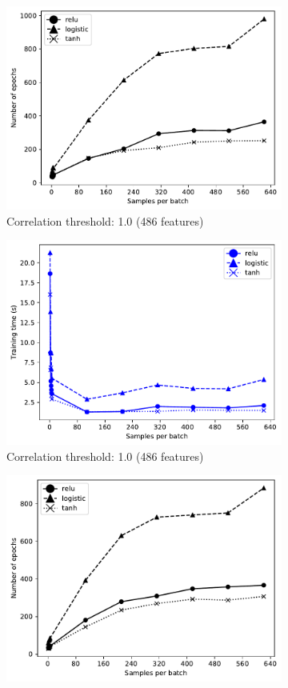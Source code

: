 \documentclass[paper=a4, fontsize=11pt]{scrartcl} %
\begin{document}
\begin{figure}[H]
	\begin{subfigure}{0.5\linewidth}
		\centering
		\includegraphics[width=0.8\linewidth]{../output/neural_network/figures/nn_convergence_global_standard_941_486}
		\caption{Correlation threshold: 1.0 (486 features)}
	\end{subfigure}
	\begin{subfigure}{0.5\linewidth}
		\centering
		\includegraphics[width=0.8\linewidth]{../output/neural_network/figures/nn_convergence_global_standard_941_486_time}
		\caption{Correlation threshold: 1.0 (486 features)}
	\end{subfigure}
	\begin{subfigure}{0.5\linewidth}
		\centering
		\includegraphics[width=0.8\linewidth]{../output/neural_network/figures/nn_convergence_global_standard_941_486_feature_pearson_90}

\end{subfigure}
\end{figure}
\end{document}
